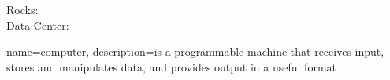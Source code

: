 
\begin{description}
	\item[Rocks:]
	\item[Data Center:]
\end{description}



{
  name=computer,
  description={is a programmable machine that receives input,
               stores and manipulates data, and provides
               output in a useful format}
}